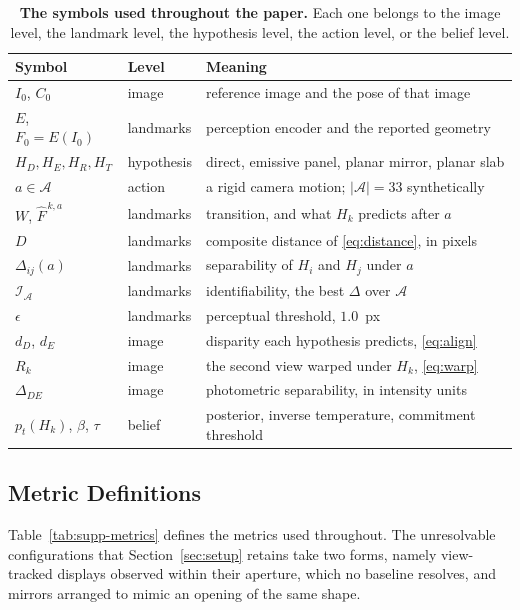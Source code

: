 \documentclass{article} %
\theoremstyle{defstyle}
\theoremstyle{plain}
\begin{document}
\begin{table}[!ht]
\caption{\textbf{The symbols used throughout the paper.} Each one belongs to the image level, the
landmark level, the hypothesis level, the action level, or the belief level.}
\label{tab:supp-notation}
\begin{center}
\footnotesize
\begin{tabular}{lll}
\toprule
\textbf{Symbol} & \textbf{Level} & \textbf{Meaning} \\
\midrule
$I_0$, $C_0$ & image & reference image and the pose of that image \\
$E$, $F_0 = E(I_0)$ & landmarks & perception encoder and the reported geometry \\
$H_D, H_E, H_R, H_T$ & hypothesis & direct, emissive panel, planar mirror, planar slab \\
$a \in \mathcal{A}$ & action & a rigid camera motion; $|\mathcal{A}| = 33$ synthetically \\
$W$, $\hat{F}^{\,k,a}$ & landmarks & transition, and what $H_k$ predicts after $a$ \\
$D$ & landmarks & composite distance of \eqref{eq:distance}, in pixels \\
$\Delta_{ij}(a)$ & landmarks & separability of $H_i$ and $H_j$ under $a$ \\
$\mathcal{I}_{\mathcal{A}}$ & landmarks & identifiability, the best $\Delta$ over $\mathcal{A}$ \\
$\epsilon$ & landmarks & perceptual threshold, $1.0$~px \\
$d_D$, $d_E$ & image & disparity each hypothesis predicts, \eqref{eq:align} \\
$R_k$ & image & the second view warped under $H_k$, \eqref{eq:warp} \\
$\Delta_{DE}$ & image & photometric separability, in intensity units \\
$p_t(H_k)$, $\beta$, $\tau$ & belief & posterior, inverse temperature, commitment threshold \\
\bottomrule
\end{tabular}
\end{center}
\end{table}

\subsection{Metric Definitions}
\label{sec:supp-metrics}

Table~\ref{tab:supp-metrics} defines the metrics used throughout. The unresolvable
configurations that Section~\ref{sec:setup} retains take two forms, namely view-tracked
displays observed within their aperture, which no baseline resolves, and mirrors arranged to
mimic an opening of the same shape.
\end{document}
